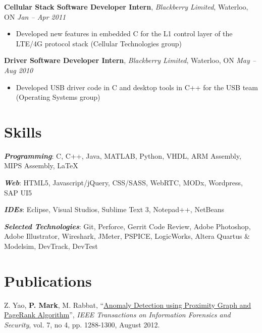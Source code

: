 \documentclass[letterpaper]{article}
\newcommand{\jobtitle}[4]{
  \textbf{#1}, \emph{#2}, {#3} \hfill \emph{#4}\\
}
\newenvironment{jobdescription}{
  \vspace{-4pt}
  \begin{itemize}
  \setlength{\itemsep}{2pt}
  \setlength{\parskip}{0pt}
  \setlength{\parsep}{0pt}
}{\end{itemize}}
\newcommand{\itemdescription}[3]{
  \textbf{#1}, {#2} \hfill \emph{#3}\\
  \medskip
}
\begin{document}
\jobtitle{Cellular Stack Software Developer Intern}{Blackberry
Limited}{Waterloo, ON}{Jan -- Apr 2011}
\begin{jobdescription}
  \item Developed new features in embedded C for the L1 control layer of the
  LTE/4G protocol stack (Cellular Technologies group)
\end{jobdescription}

\jobtitle{Driver Software Developer Intern}{Blackberry
Limited}{Waterloo, ON}{May -- Aug 2010} 
\begin{jobdescription}
  \item Developed USB driver code in C and desktop tools in C++ for the USB
  team (Operating Systems group)
\end{jobdescription}

\medskip

\section*{Skills}
\emph{\textbf{Programming}}: C, C++, Java, MATLAB, Python, VHDL, ARM Assembly,
MIPS Assembly, \LaTeX\\
\medskip

\emph{\textbf{Web}}: HTML5, Javascript/jQuery, CSS/SASS, WebRTC, MODx,
Wordpress, SAP UI5
\medskip

\emph{\textbf{IDEs}}: Eclipse, Visual Studios, Sublime Text 3, Notepad++,
NetBeans
\medskip

\emph{\textbf{Selected Technologies}}: Git, Perforce, Gerrit Code
Review, Adobe Photoshop, Adobe Illustrator, Wireshark, JMeter, PSPICE,
LogicWorks, Altera Quartus \& Modelsim, DevTrack, DevTest\\
\bigskip

\hypertarget{sec:publications}{}
\section*{Publications}
Z. Yao, \textbf{P. Mark}, M. Rabbat, 
``\href{http://ieeexplore.ieee.org/xpl/articleDetails.jsp?arnumber=6175122}
{Anomaly Detection using Proximity Graph and PageRank Algorithm}'', \emph{IEEE 
Transactions on Information Forensics and Security}, vol. 7, no 4, pp. 
1288-1300, August 2012.
\bigskip

\end{document}
